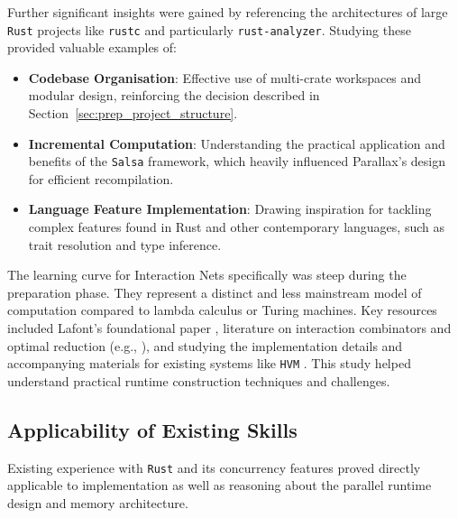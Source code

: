 Further significant insights were gained by referencing the architectures of large \texttt{Rust} projects like \texttt{rustc} and particularly \texttt{rust-analyzer}. Studying these provided valuable examples of:
\begin{itemize}
    \item \textbf{Codebase Organisation}: Effective use of multi-crate workspaces and modular design, reinforcing the decision described in Section~\ref{sec:prep_project_structure}.
    \item \textbf{Incremental Computation}: Understanding the practical application and benefits of the \texttt{Salsa} framework, which heavily influenced Parallax's design for efficient recompilation.
    \item \textbf{Language Feature Implementation}: Drawing inspiration for tackling complex features found in Rust and other contemporary languages, such as trait resolution and type inference.
\end{itemize}

The learning curve for Interaction Nets specifically was steep during the preparation phase. They represent a distinct and less mainstream model of computation compared to lambda calculus or Turing machines. Key resources included Lafont's foundational paper \cite{lafont1990interactionnets}, literature on interaction combinators and optimal reduction (e.g., \cite{mazza}), and studying the implementation details and accompanying materials for existing systems like \texttt{HVM} \cite{HVMGithub}. This study helped understand practical runtime construction techniques and challenges.

\subsection{Applicability of Existing Skills}
Existing experience with \texttt{Rust} and its concurrency features proved directly applicable to implementation as well as reasoning about the parallel runtime design and memory architecture.
